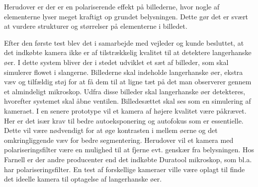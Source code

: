 Herudover er der er en polariserende effekt på billederne, hvor nogle af elementerne lyser meget kraftigt op grundet belysningen. Dette gør det er svært at vurdere strukturer og størrelser på elementerne i billedet. 

Efter den første test blev det i samarbejde med vejleder og kunde besluttet, at det indkøbte kamera ikke er af tilstrækkelig kvalitet til at detektere langerhanske øer. I dette system bliver der i stedet udviklet et sæt af billeder, som skal simulerer flowet i slangerne. Billederne skal indeholde langerhanske øer, ekstra væv og tilfældig støj for at få dem til at ligne tæt på det man observerer gennem et almindeligt mikroskop. Udfra disse billeder skal langerhanske øer detekteres, hvorefter systemet skal åbne ventilen. Billedesættet skal ses som en simulering af kameraet. I en senere prototype vil et kamera af højere kvalitet være påkrævet. Her er det især krav til bedre autoeksponering og autofokus som er essentielle. Dette vil være nødvendigt for at øge kontrasten i mellem øerne og det omkringliggende væv for bedre segmentering. Herudover vil et kamera med polariseringsfilter være en mulighed til at fjerne evt. genskær fra belysningen. Hos Farnell er der andre producenter end det indkøbte Duratool mikroskop, som bl.a. har polariseringsfilter. En test af forskellige kameraer ville være oplagt til finde det ideelle kamera til optagelse af langerhanske øer. 